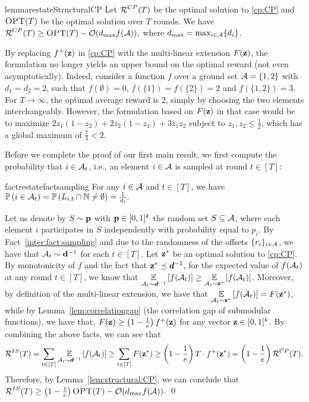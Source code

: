 \begin{restatable}{lemma}{restateStructuralCP}\label{lem:structural:CP}
Let $\operatorname{\mathcal{R}}^{CP}(T)$ be the optimal solution to \eqref{cp:CP} and $\textsc{OPT}(T)$ be the optimal solution over $T$ rounds. We have
$
\operatorname{\mathcal{R}}^{CP}(T) \geq \textsc{OPT}(T) - \mathcal{O}(d_{\max} f(\operatorname{\mathcal{A}})),
$ where $d_{\max} = \max_{i \in \operatorname{\mathcal{A}}}\{d_i\}$.
\end{restatable}

\begin{remark}
By replacing $f^+(\operatorname{\mathbf{z}})$ in \eqref{cp:CP} with the multi-linear extension $F(\operatorname{\mathbf{z}})$, the formulation no longer yields an upper bound on the optimal reward (not even asymptotically). Indeed, consider a function $f$ over a ground set $\operatorname{\mathcal{A}}=\{1,2\}$ with $d_1 = d_2 = 2$, such that $f(\emptyset) = 0$, $f(\{1\}) = f(\{2\}) = 2$ and $f(\{1,2\}) = 3$. For $T \to \infty$, the optimal average reward is $2$, simply by choosing the two elements interchangeably. However, the formulation based on $F(\operatorname{\mathbf{z}})$ in that case would be to maximize $2z_1(1-z_2) + 2z_2(1-z_1) + 3 z_1 z_2$ subject to $z_1,z_2 \leq \frac{1}{2}$, which has a global maximum of $\frac{7}{4} < 2$.
\end{remark}


Before we complete the proof of our first main result, we first compute the probability that $i \in \operatorname{\mathcal{A}}_t$, i.e., an element $i \in \operatorname{\mathcal{A}}$ is sampled at round $t \in [T]$:

\begin{restatable}{fact}{restatefactsampling}\label{inter:fact:sampling}
For any $i \in \operatorname{\mathcal{A}}$ and $t \in [T]$, we have
$\mathop{\mathbb{P}\left(i \in \operatorname{\mathcal{A}}_t\right)} = \mathop{\mathbb{P}\left(L_{i,t} \cap \mathbb{N} \neq \emptyset \right)} = \frac{1}{d_i}.
$
\end{restatable}

Let us denote by $S \sim {\bf p}$ with ${\bf p} \in [0,1]^k$ the random set $S \subseteq \operatorname{\mathcal{A}}$, where each element $i$ participates in $S$ independently with probability equal to $p_i$. 
By Fact~\ref{inter:fact:sampling} and due to the randomness of the offsets $\{r_i\}_{i \in \operatorname{\mathcal{A}}}$, we have that $\operatorname{\mathcal{A}}_t \sim {\bf d}^{-1}$ for each $t \in [T]$. Let $\operatorname{\mathbf{z}}^*$ be an optimal solution to \eqref{cp:CP}. By monotonicity of $f$ and the fact that $\operatorname{\mathbf{z}}^* \preceq \bm{d}^{-1}$, for the expected value of $f(\operatorname{\mathcal{A}}_t)$ at any round $t \in [T]$, we know that $\mathop{\underset{\operatorname{\mathcal{A}}_t \sim \bm{d}^{-1}}{\mathbb{E}}\left[f(\operatorname{\mathcal{A}}_t)\right]} \geq \mathop{\underset{\operatorname{\mathcal{A}}_t \sim \operatorname{\mathbf{z}}^*}{\mathbb{E}}\left[f(\operatorname{\mathcal{A}}_t)\right]}$. Moreover, by definition of the multi-linear extension, we have that $\mathop{\underset{\operatorname{\mathcal{A}}_t \sim \operatorname{\mathbf{z}}^*}{\mathbb{E}}\left[f(\operatorname{\mathcal{A}}_t)\right]} = F(\operatorname{\mathbf{z}}^*)$, while by Lemma~\ref{lem:correlationgap} (the correlation gap of submodular functions), we have that, $F(\operatorname{\mathbf{z}}) \geq \left(1 - \frac{1}{e}\right)f^+(\operatorname{\mathbf{z}})$ for any vector $\operatorname{\mathbf{z}} \in [0,1]^k$. By combining the above facts, we can see that
\begin{align*}
\operatorname{\mathcal{R}}^{IS}(T) = \sum_{t \in [T]} \mathop{\underset{\operatorname{\mathcal{A}}_t \sim \bm{d}^{-1}}{\mathbb{E}}\left[f(\operatorname{\mathcal{A}}_t)\right]} \geq 
\sum_{t \in [T]} F(\operatorname{\mathbf{z}}^*) \geq \left(1 - \frac{1}{e}\right)T\cdot f^+(\operatorname{\mathbf{z}}^*) = \left(1 - \frac{1}{e}\right) \operatorname{\mathcal{R}}^{CP}(T).
\end{align*}
Therefore, by Lemma~\ref{lem:structural:CP}, we can conclude that $\operatorname{\mathcal{R}}^{IS}(T) \geq \left(1 - \frac{1}{e}\right)\textsc{OPT}(T) - \mathcal{O}(d_{\max} f(\operatorname{\mathcal{A}}))$.
\qed
\newline


